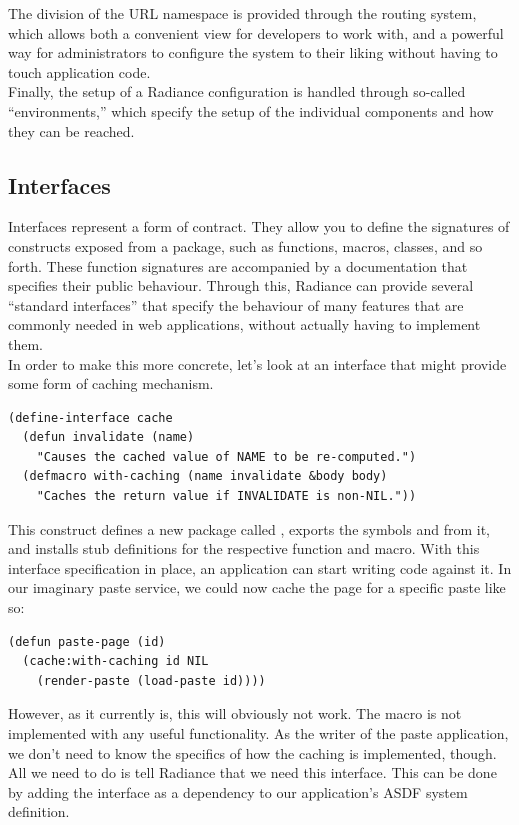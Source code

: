 \documentclass{sig-alternate}
\begin{document}
The division of the URL namespace is provided through the routing system, which allows both a convenient view for developers to work with, and a powerful way for administrators to configure the system to their liking without having to touch application code. \\

Finally, the setup of a Radiance configuration is handled through so-called ``environments,'' which specify the setup of the individual components and how they can be reached.

\subsection{Interfaces}
Interfaces represent a form of contract. They allow you to define the signatures of constructs exposed from a package, such as functions, macros, classes, and so forth. These function signatures are accompanied by a documentation that specifies their public behaviour. Through this, Radiance can provide several ``standard interfaces'' that specify the behaviour of many features that are commonly needed in web applications, without actually having to implement them. \\

In order to make this more concrete, let's look at an interface that might provide some form of caching mechanism.

\begin{verbatim}
(define-interface cache
  (defun invalidate (name)
    "Causes the cached value of NAME to be re-computed.")
  (defmacro with-caching (name invalidate &body body)
    "Caches the return value if INVALIDATE is non-NIL."))
\end{verbatim}

This construct defines a new package called , exports the symbols  and  from it, and installs stub definitions for the respective function and macro. With this interface specification in place, an application can start writing code against it. In our imaginary paste service, we could now cache the page for a specific paste like so:

\begin{verbatim}
(defun paste-page (id)
  (cache:with-caching id NIL
    (render-paste (load-paste id))))
\end{verbatim}

However, as it currently is, this will obviously not work. The  macro is not implemented with any useful functionality. As the writer of the paste application, we don't need to know the specifics of how the caching is implemented, though. All we need to do is tell Radiance that we need this interface. This can be done by adding the interface as a dependency to our application's ASDF system definition.
\end{document}
